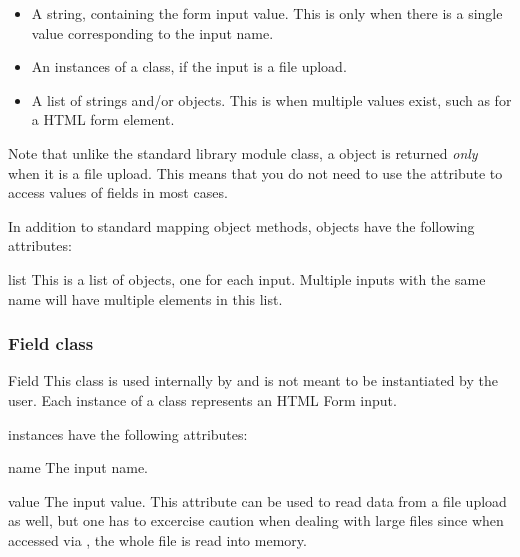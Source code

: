 \begin{itemize}
\item
A string, containing the form input value. This is only when there is a single
value corresponding to the input name.
\item
An instances of a  class, if the input is a file upload.
\item
A list of strings and/or  objects. This is when multiple values
exist, such as for a  HTML form element.
\end{itemize}

Note that unlike the standard library  module
 class, a
 object is returned \emph{only} when it is a file
upload. This means that you do not need to use the 
attribute to access values of fields in most cases.

In addition to standard mapping object methods,  objects
have the following attributes:

\begin{memberdesc}{list}
This is a list of  objects, one for each input. Multiple
inputs with the same name will have multiple elements in this list.
\end{memberdesc}

\subsubsection{Field class\label{pyapi-util-fstor-fld}}

\begin{classdesc}{Field}{}
This class is used internally by  and is not
meant to be instantiated by the user. Each instance of a 
class represents an HTML Form input.
\end{classdesc}

 instances have the following attributes:

\begin{memberdesc}{name}
The input name.
\end{memberdesc}

\begin{memberdesc}{value}
The input value. This attribute can be used to read data from a file
upload as well, but one has to excercise caution when dealing with
large files since when accessed via , the whole file is
read into memory.
\end{memberdesc}

